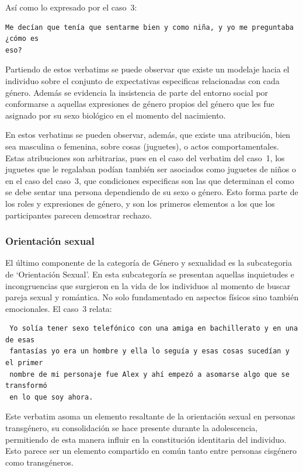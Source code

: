 Así como lo expresado por el caso~3:

\begin{verbatim}
Me decían que tenía que sentarme bien y como niña, y yo me preguntaba ¿cómo es
eso?
\end{verbatim}

Partiendo de estos verbatims se puede observar que existe un modelaje hacia el
individuo sobre el conjunto de expectativas especificas relacionadas con cada
género. Además se evidencia la insistencia de parte del entorno social por
conformarse a aquellas expresiones de género propios del género que les fue
asignado por su sexo biológico en el momento del nacimiento.

En estos verbatims se pueden observar, además, que existe una atribución, bien
sea masculina o femenina, sobre cosas (juguetes), o actos comportamentales.
Estas atribuciones son arbitrarias, pues en el caso del verbatim del caso~1,
los juguetes que le regalaban podían también ser asociados como juguetes de
niños o en el caso del caso~3, que condiciones especificas son las que
determinan el como se debe sentar una persona dependiendo de su sexo o género.
Esto forma parte de los roles y expresiones de género, y son los primeros
elementos a los que los participantes parecen demostrar rechazo.

\subsubsection{Orientación sexual}

El último componente de la categoría de Género y sexualidad es la subcategoria
de ‘Orientación Sexual’. En esta subcategoría se presentan aquellas inquietudes
e incongruencias que surgieron en la vida de los individuos al momento de buscar
pareja sexual y romántica. No solo fundamentado en aspectos físicos sino también
emocionales. El caso~3 relata:

\begin{verbatim}
 Yo solía tener sexo telefónico con una amiga en bachillerato y en una de esas
 fantasías yo era un hombre y ella lo seguía y esas cosas sucedían y el primer
 nombre de mi personaje fue Alex y ahí empezó a asomarse algo que se transformó
 en lo que soy ahora.
\end{verbatim}

Este verbatim asoma un elemento resaltante de la orientación sexual en personas
transgénero, su consolidación se hace presente durante la adolescencia,
permitiendo de esta manera influir en la constitución identitaria del individuo.
Esto parece ser un elemento compartido en común tanto entre personas cisgénero
como transgéneros.

